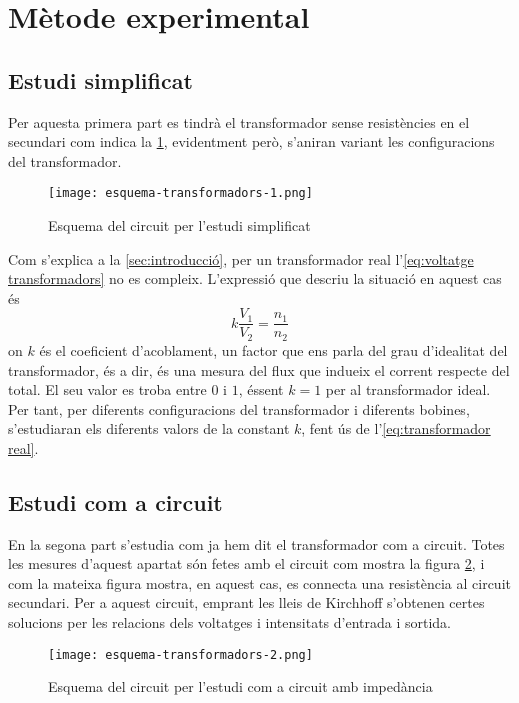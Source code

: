 \section{Mètode experimental}\label{sec:met}
\subsection{Estudi simplificat}
Per aquesta primera part es tindrà el transformador sense resistències en el secundari com indica la \cref{fig:esquema 1}, evidentment però, s'aniran variant les configuracions del transformador.

\begin{figure}[htb]
  \centering \small \sffamily
  \texttt{[image: esquema-transformadors-1.png]}
  \caption{Esquema del circuit per l'estudi simplificat}
  \label{fig:esquema 1}
\end{figure}

Com s'explica a la \cref{sec:introducció}, per un transformador real l'\cref{eq:voltatge transformadors} no es compleix. L'expressió que descriu la situació en aquest cas és 
\begin{equation}\label{eq:transformador real}
  k\frac{V_1}{V_2}=\frac{n_1}{n_2}
\end{equation}
on $k$ és el coeficient d'acoblament, un factor que ens parla del grau d'idealitat del transformador, és a dir, és una mesura del flux que indueix el corrent respecte del total. El seu valor es troba entre $0$ i $1$, éssent $k=1$ per al transformador ideal. Per tant, per diferents configuracions del transformador i diferents bobines, s'estudiaran els diferents valors de la constant $k$, fent ús de l'\cref{eq:transformador real}.

\subsection{Estudi com a circuit}\label{sec:metcirc}
En la segona part s'estudia com ja hem dit el transformador com a circuit. Totes les mesures d'aquest apartat són fetes amb el circuit com mostra la figura \cref{fig:esq2}, i com la mateixa figura mostra, en aquest cas, es connecta una resistència al circuit secundari. Per a aquest circuit, emprant les lleis de Kirchhoff s'obtenen certes solucions per les relacions dels voltatges i intensitats d'entrada i sortida. 

\begin{figure}[htbp!]
  \centering \small \sffamily
  \texttt{[image: esquema-transformadors-2.png]}
  \caption{Esquema del circuit per l'estudi com a circuit amb impedància}
  \label{fig:esq2}
\end{figure}

